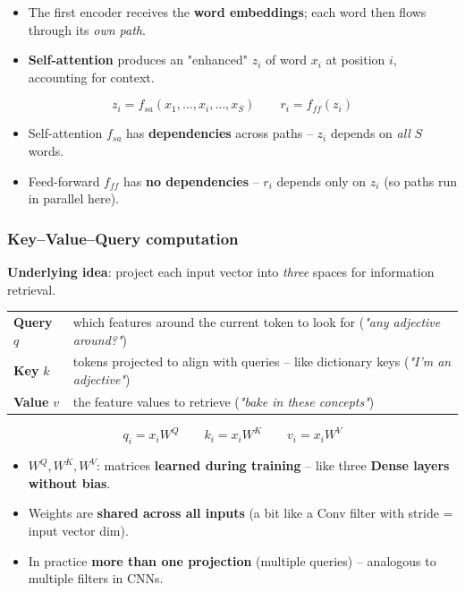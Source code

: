 \documentclass[10pt,a4paper]{article}
\begin{document}
	\begin{itemize}[leftmargin=*]
		\item The first encoder receives the \textbf{word embeddings}; each word then flows through its \emph{own path}.
		\item \textbf{Self-attention} produces an "enhanced" $z_i$ of word $x_i$ at position $i$, accounting for context.
	\end{itemize}
	\begin{formulabox}
		\[
		z_i = f_{sa}(x_1,\dots,x_i,\dots,x_S) \qquad r_i = f_{ff}(z_i)
		\]
	\end{formulabox}
	\begin{itemize}[leftmargin=*]
		\item Self-attention $f_{sa}$ has \textbf{dependencies} across paths -- $z_i$ depends on \emph{all} $S$ words.
		\item Feed-forward $f_{ff}$ has \textbf{no dependencies} -- $r_i$ depends only on $z_i$ (so paths run in parallel here).
	\end{itemize}

	\subsubsection*{Key--Value--Query computation}

	\textbf{Underlying idea}: project each input vector into \emph{three} spaces for information retrieval.
	\begin{center}
	\begin{tabular}{@{}ll@{}}
		\toprule
		\textbf{Query} $q$ & which features around the current token to look for (\emph{"any adjective around?"}) \\
		\textbf{Key} $k$ & tokens projected to align with queries -- like dictionary keys (\emph{"I'm an adjective"}) \\
		\textbf{Value} $v$ & the feature values to retrieve (\emph{"bake in these concepts"}) \\
		\bottomrule
	\end{tabular}
	\end{center}
	\begin{formulabox}
		\[
		q_i = x_i W^Q \qquad k_i = x_i W^K \qquad v_i = x_i W^V
		\]
	\end{formulabox}
	\begin{itemize}[leftmargin=*]
		\item $W^Q, W^K, W^V$: matrices \textbf{learned during training} -- like three \textbf{Dense layers without bias}.
		\item Weights are \textbf{shared across all inputs} (a bit like a Conv filter with stride = input vector dim).
		\item In practice \textbf{more than one projection} (multiple queries) -- analogous to multiple filters in CNNs.
	\end{itemize}
\end{document}
